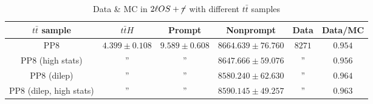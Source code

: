 \documentclass[11pt]{article}
\begin{document}
	\begin{table}[htp]
	\caption{Data \& MC in $2\ell OS+\cancel{\tau}$ with different $t\bar{t}$ samples}
	\begin{center}
	\begin{tabular}{|c|c|c|c|c|c|}
	\hline
	$t\bar{t}$ sample 	& $t\bar{t}H$	& Prompt		& Nonprompt		& 	 Data	& Data/MC \\
	\hline
	PP8 				& 	$4.399 \pm 0.108$ 		& $9.589 \pm 0.608$ 		& $8664.639 \pm 76.760$	&  $8271$ & $0.954$\\
	PP8 (high stats)		& 			''	 		&			''			& $8647.666 \pm 59.076$	&  	''	  & $0.956$\\
	PP8 (dilep) 			& 			''	 		& 			''			& $8580.240 \pm 62.630$	&   	''	  & $0.964$\\
	PP8 (dilep, high stats)	& 			''			& 			''	 		& $8590.145 \pm 49.257$	&   	''	  & $0.963$\\ 
	\hline
	\end{tabular}
	\end{center}
	\label{default}
	\end{table}%
\end{document}
